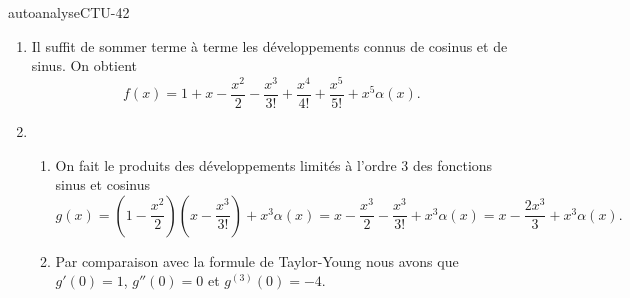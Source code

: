 
\begin{corrige}{autoanalyseCTU-42}

\begin{enumerate}
\item Il suffit de sommer terme à terme les développements connus de cosinus et de sinus. On obtient 
\[
f(x)=1+x-\frac{x^2}{2}-\frac{x^3}{3!} +\frac{x^4}{4!}+\frac{x^5}{5!} + x^5\alpha(x).
\]
\item \begin{enumerate}
\item On fait le produits des développements limités à l'ordre 3 des fonctions sinus et cosinus
\[
g(x)=\left(1-\frac{x^2}{2}\right)\left(x-\frac{x^3}{3!}\right) + x^3\alpha(x) = x-\frac{x^3}{2}-\frac{x^3}{3!}+ x^3\alpha(x) = x-\frac{2x^3}{3}+ x^3\alpha(x).
\]
\item Par comparaison avec la formule de Taylor-Young nous avons que $g'(0)= 1$, $g''(0)= 0$ et $g^{(3)}(0) = -4$.
\end{enumerate}
\end{enumerate}


\end{corrige}   
